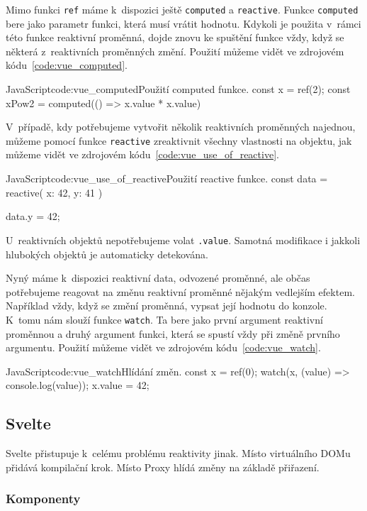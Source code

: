 \documentclass[
  master,
  program=ainf,
  tables=false,
  sourcecodes,
  glossaries,
  index
]{kidiplom}
\begin{document}
Mimo funkci {\tt ref} máme k~dispozici ještě {\tt computed} a {\tt reactive}. Funkce {\tt computed} bere jako parametr
funkci, která musí vrátit hodnotu. Kdykoli je použita v~rámci této funkce reaktivní proměnná, 
dojde znovu ke spuštění funkce vždy, když se některá z~reaktivních proměnných změní.
Použití můžeme vidět ve zdrojovém kódu~\ref{code:vue_computed}.

\begin{kicode}{JavaScript}{code:vue_computed}{Použití computed funkce.}
  const x = ref(2);
  const xPow2 = computed(() => x.value * x.value)
\end{kicode}

V~případě, kdy potřebujeme vytvořit několik reaktivních proměnných najednou, můžeme pomocí
funkce {\tt reactive} zreaktivnit všechny vlastnosti na objektu, jak můžeme vidět ve zdrojovém kódu~\ref{code:vue_use_of_reactive}.

\begin{kicode}{JavaScript}{code:vue_use_of_reactive}{Použití reactive funkce.}
  const data = reactive({
    x: 42,
    y: 41
  })

  data.y = 42;
\end{kicode}

U~reaktivních objektů nepotřebujeme volat {\tt .value}. Samotná modifikace i jakkoli hlubokých
objektů je automaticky detekována. 

Nyný máme k~dispozici reaktivní data, odvozené proměnné, ale občas potřebujeme reagovat
na změnu reaktivní proměnné nějakým vedlejším efektem. Například vždy, když se změní
proměnná, vypsat její hodnotu do konzole. K~tomu nám slouží funkce {\tt watch}. Ta bere jako 
první argument reaktivní proměnnou a druhý argument funkci, která se spustí vždy při změně
prvního argumentu. Použití můžeme vidět ve zdrojovém kódu~\ref{code:vue_watch}.

\begin{kicode}{JavaScript}{code:vue_watch}{Hlídání změn.}
  const x = ref(0);
  watch(x, (value) => console.log(value));
  x.value = 42;
\end{kicode}

\subsection{Svelte}
Svelte \cite{svelte} přistupuje k~celému problému reaktivity jinak. Místo virtuálního DOMu přidává kompilační
krok. Místo Proxy \cite{proxy} hlídá změny na základě přiřazení.

\subsubsection{Komponenty}
\end{document}
